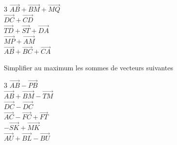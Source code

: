 {\begin{Exercice}
\begin{multicols}{3}
$\overrightarrow{AB}+\overrightarrow{BM}+\overrightarrow{MQ} $\\

$\overrightarrow{DC}+\overrightarrow{CD} $\\

$\overrightarrow{TD}+\overrightarrow{ST}+\overrightarrow{DA} $\\

$\overrightarrow{MP}+\overrightarrow{AM} $\\

$\overrightarrow{AB}+\overrightarrow{BC} +\overrightarrow{CA}$\\

\end{multicols}
\end{Exercice} 



\begin{Exercice} %
Simplifier au maximum les sommes de vecteurs suivantes
\begin{multicols}{3}
$\overrightarrow{AB}-\overrightarrow{PB} $\\

$\overrightarrow{AB}+\overrightarrow{BM}-\overrightarrow{TM} $\\

$\overrightarrow{DC}-\overrightarrow{DC} $\\

$\overrightarrow{AC}-\overrightarrow{FC}+\overrightarrow{FT} $\\

$-\overrightarrow{SK}+\overrightarrow{MK} $\\

$\overrightarrow{AU}+\overrightarrow{BL} -\overrightarrow{BU}$\\

\end{multicols}
\end{Exercice} 



}
